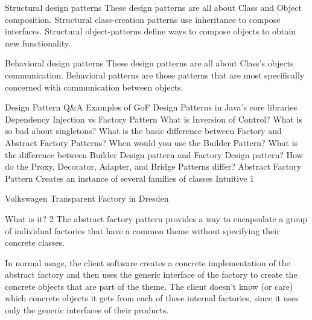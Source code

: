 Structural design patterns
These design patterns are all about Class and Object composition. Structural class-creation patterns use inheritance to compose interfaces. Structural object-patterns define ways to compose objects to obtain new functionality.

















Behavioral design patterns
These design patterns are all about Class's objects communication. Behavioral patterns are those patterns that are most specifically concerned with communication between objects.

























Design Pattern Q&A
Examples of GoF Design Patterns in Java's core libraries
Dependency Injection vs Factory Pattern
What is Inversion of Control?
What is so bad about singletons?
What is the basic difference between Factory and Abstract Factory Patterns?
When would you use the Builder Pattern?
What is the difference between Builder Design pattern and Factory Design pattern?
How do the Proxy, Decorator, Adapter, and Bridge Patterns differ?
Abstract Factory Pattern
Creates an instance of several families of classes
Intuitive 1


Volkswagen Transparent Factory in Dresden

What is it? 2
The abstract factory pattern provides a way to encapsulate a group of individual factories that have a common theme without specifying their concrete classes.

In normal usage, the client software creates a concrete implementation of the abstract factory and then uses the generic interface of the factory to create the concrete objects that are part of the theme. The client doesn't know (or care) which concrete objects it gets from each of these internal factories, since it uses only the generic interfaces of their products.

